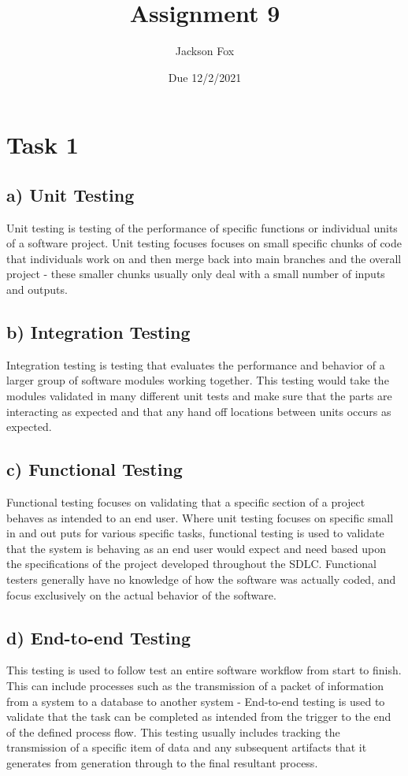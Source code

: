 \documentclass[11pt, oneside]{article}   	%
\title{Assignment 9}
\author{Jackson Fox}
\date{Due 12/2/2021}							%
\begin{document}
\maketitle
\section*{Task 1}
\subsection*{a) Unit Testing}
Unit testing is testing of the performance of specific functions or individual units of a software project.  Unit testing focuses focuses on small specific chunks of code that individuals work on and then merge back into main branches and the overall project - these smaller chunks usually only deal with a small number of inputs and outputs.

\subsection*{b) Integration Testing}
Integration testing is testing that evaluates the performance and behavior of a larger group of software modules working together.  This testing would take the modules validated in many different unit tests and make sure that the parts are interacting as expected and that any hand off locations between units occurs as expected.

\subsection*{c) Functional Testing}
Functional testing focuses on validating that a specific section of a project behaves as intended to an end user.  Where unit testing focuses on specific small in and out puts for various specific tasks, functional testing is used to validate that the system is behaving as an end user would expect and need based upon the specifications of the project developed throughout the SDLC.  Functional testers generally have no knowledge of how the software was actually coded, and focus exclusively on the actual behavior of the software.

\subsection*{d) End-to-end Testing}
This testing is used to follow test an entire software workflow from start to finish.  This can include processes such as the transmission of a packet of information from a system to a database to another system - End-to-end testing is used to validate that the task can be completed as intended from the trigger to the end of the defined process flow.  This testing usually includes tracking the transmission of a specific item of data and any subsequent artifacts that it generates from generation through to the final resultant process.
\end{document}
